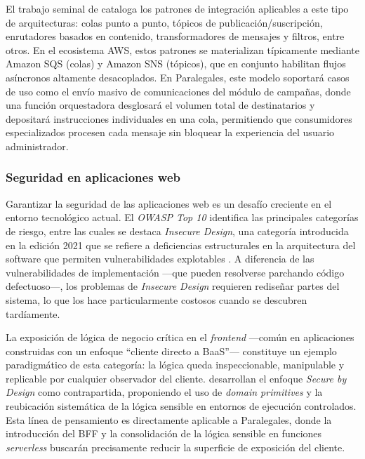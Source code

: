 El trabajo seminal de \textcite{Hohpe2003} cataloga los patrones de integración aplicables a este tipo de arquitecturas: colas punto a punto, tópicos de publicación/suscripción, enrutadores basados en contenido, transformadores de mensajes y filtros, entre otros. En el ecosistema AWS, estos patrones se materializan típicamente mediante Amazon SQS (colas) y Amazon SNS (tópicos), que en conjunto habilitan flujos asíncronos altamente desacoplados. En Paralegales, este modelo soportará casos de uso como el envío masivo de comunicaciones del módulo de campañas, donde una función orquestadora desglosará el volumen total de destinatarios y depositará instrucciones individuales en una cola, permitiendo que consumidores especializados procesen cada mensaje sin bloquear la experiencia del usuario administrador.

\subsubsection{Seguridad en aplicaciones web}

Garantizar la seguridad de las aplicaciones web es un desafío creciente en el entorno tecnológico actual. El \textit{OWASP Top 10} identifica las principales categorías de riesgo, entre las cuales se destaca \textit{Insecure Design}, una categoría introducida en la edición 2021 que se refiere a deficiencias estructurales en la arquitectura del software que permiten vulnerabilidades explotables \cite{OWASP2021}. A diferencia de las vulnerabilidades de implementación —que pueden resolverse parchando código defectuoso—, los problemas de \textit{Insecure Design} requieren rediseñar partes del sistema, lo que los hace particularmente costosos cuando se descubren tardíamente.

La exposición de lógica de negocio crítica en el \textit{frontend} —común en aplicaciones construidas con un enfoque ``cliente directo a BaaS''— constituye un ejemplo paradigmático de esta categoría: la lógica queda inspeccionable, manipulable y replicable por cualquier observador del cliente. \textcite{BirrEngwall2024} desarrollan el enfoque \textit{Secure by Design} como contrapartida, proponiendo el uso de \textit{domain primitives} y la reubicación sistemática de la lógica sensible en entornos de ejecución controlados. Esta línea de pensamiento es directamente aplicable a Paralegales, donde la introducción del BFF y la consolidación de la lógica sensible en funciones \textit{serverless} buscarán precisamente reducir la superficie de exposición del cliente.

